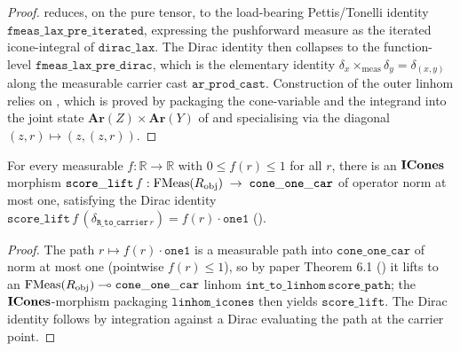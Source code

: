 \begin{proof}
 reduces, on the pure
tensor, to the load-bearing Pettis/Tonelli identity
$\mathtt{fmeas\_lax\_pre\_iterated}$, expressing the pushforward
measure as the iterated icone-integral of $\mathtt{dirac\_lax}$.
The Dirac identity 
then collapses to the function-level
$\mathtt{fmeas\_lax\_pre\_dirac}$, which is the elementary identity
$\delta_x \times_{\mathrm{meas}} \delta_y =
\delta_{(x,y)}$ along the measurable carrier cast
$\mathtt{ar\_prod\_cast}$. Construction of the outer linhom relies on
, which is
proved by packaging the cone-variable and the integrand into the
joint state $\mathbf{Ar}(Z) \times \mathbf{Ar}(Y)$ of
and specialising via the diagonal $(z, r) \mapsto (z, (z, r))$.
\end{proof}

\begin{lemma}\label{lem:ppl-score-tm-lift}
\rocqok
{}\rocqok
{}
For every measurable $f : \mathbb{R} \to \mathbb{R}$ with
$0 \le f(r) \le 1$ for all $r$, there is an $\mathbf{ICones}$ morphism
$\mathtt{score\_lift}\,f :
   \mathrm{FMeas}(R_{\mathrm{obj}}) \;\to\; \mathtt{cone\_one\_car}$
of operator norm at most one, satisfying the Dirac identity
$\mathtt{score\_lift}\,f\,(\delta_{\mathtt{R\_to\_carrier}\,r})
= f(r) \cdot \mathtt{one1}$
().
\end{lemma}

\begin{proof}
The path $r \mapsto f(r) \cdot \mathtt{one1}$ is a measurable path
into $\mathtt{cone\_one\_car}$ of norm at most one (pointwise
$f(r) \le 1$), so by paper Theorem 6.1
() it lifts to an
$\mathrm{FMeas}(R_{\mathrm{obj}}) \multimap \mathtt{cone\_one\_car}$ linhom
$\mathtt{int\_to\_linhom}\,\mathtt{score\_path}$; the
$\mathbf{ICones}$-morphism packaging $\mathtt{linhom\_icones}$ then yields
$\mathtt{score\_lift}$. The Dirac identity follows by integration
against a Dirac evaluating the path at the carrier point.
\end{proof}

